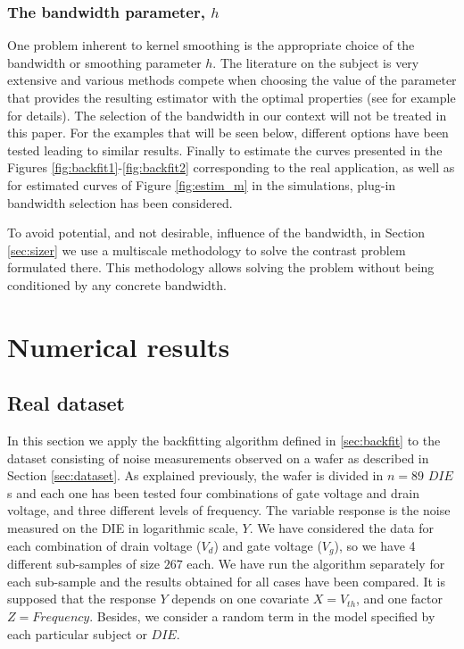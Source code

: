 \documentclass[sn-mathphys]{sn-jnl}%
\theoremstyle{thmstyleone}%
\theoremstyle{thmstyletwo}%
\theoremstyle{thmstylethree}%
\begin{document}
\subsubsection{The bandwidth parameter, $h$}
One problem inherent to kernel smoothing is the appropriate choice of the bandwidth or smoothing parameter $h$. 
The literature on the subject is very extensive and various methods compete when choosing the value of the parameter that provides the resulting estimator with the optimal properties (see for example \cite{FG1996} for details). The selection of the bandwidth in our context will not be treated in this paper. For the examples that will be seen below, different options have been tested leading to similar results. Finally to estimate the curves presented in the Figures \ref{fig:backfit1}-\ref{fig:backfit2} corresponding to the real application, as well as for estimated curves of Figure \ref{fig:estim_m} in the simulations, plug-in bandwidth selection has been considered.

To avoid potential, and not desirable, influence of the bandwidth, in Section \ref{sec:sizer} we use a multiscale methodology to solve the contrast problem formulated there. This methodology allows solving the problem without being conditioned by any concrete bandwidth.

\section{Numerical results}\label{sec:result}

\subsection{Real dataset}\label{sec:bf_noise}

In this section we apply the backfitting algorithm defined in \ref{sec:backfit} to the dataset consisting of noise measurements observed on a wafer as  described in Section \ref{sec:dataset}. As explained previously, the wafer is divided in $n=89$ $DIE$s and each one has been tested four combinations of gate voltage and drain voltage, and three different levels of frequency. 
The variable response is the noise measured on the DIE in logarithmic scale, $Y$. We have considered the data for each combination of drain voltage ($V_d$) and gate voltage ($V_g$), so we have 4 different sub-samples of size $267$ each. We have run the algorithm separately for each sub-sample and the results obtained for all cases have been compared. 
  It is supposed that the response $Y$ depends on one covariate $X=V_{th}$, and one factor $Z=Frequency$. Besides, we consider a random term in the model specified by each particular subject or $DIE$.
\end{document}
